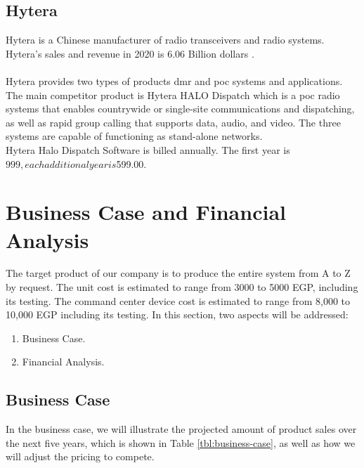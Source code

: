 \subsection{Hytera}
Hytera \cite{Hytera} is a Chinese manufacturer of radio transceivers and radio systems. Hytera's sales and revenue in 2020 is 6.06 Billion dollars \cite{Hytera-Finance}.
\\
\\
Hytera provides two types of products \acrfull{dmr} and \acrfull{poc} systems and applications.
The main competitor product is Hytera HALO Dispatch which is a \acrfull{poc} radio systems that enables countrywide or single-site communications and dispatching, as well as rapid group calling that supports data, audio, and video. The three systems are capable of functioning as stand-alone networks.
\\
Hytera Halo Dispatch Software is billed annually. The first year is $999, each additional year is $599.00.

\section{Business Case and Financial Analysis }
The target product of our company is to produce the entire system from A to Z by request. The unit cost is estimated to range from 3000 to 5000 EGP, including its testing. The command center device cost is estimated to range from 8,000 to 10,000 EGP including its testing.
In this section, two aspects will be addressed:
\begin{enumerate}[itemsep=1pt, topsep=5pt]
    \item Business Case.
    \item Financial Analysis.
\end{enumerate}

\subsection{Business Case}
In the business case, we will illustrate the projected amount of product sales over the next five years, which is shown in Table \ref{tbl:business-case}, as well as how we will adjust the pricing to compete.

